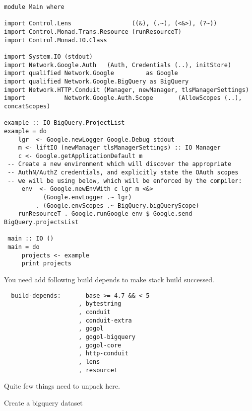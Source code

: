 \begin{verbatim}
module Main where

import Control.Lens                 ((&), (.~), (<&>), (?~))
import Control.Monad.Trans.Resource (runResourceT)
import Control.Monad.IO.Class

import System.IO (stdout)
import Network.Google.Auth   (Auth, Credentials (..), initStore)
import qualified Network.Google         as Google
import qualified Network.Google.BigQuery as BigQuery
import Network.HTTP.Conduit (Manager, newManager, tlsManagerSettings)
import           Network.Google.Auth.Scope       (AllowScopes (..),                                                  concatScopes)

example :: IO BigQuery.ProjectList
example = do
    lgr  <- Google.newLogger Google.Debug stdout
    m <- liftIO (newManager tlsManagerSettings) :: IO Manager
    c <- Google.getApplicationDefault m
 -- Create a new environment which will discover the appropriate
 -- AuthN/AuthZ credentials, and explicitly state the OAuth scopes
 -- we will be using below, which will be enforced by the compiler:
     env  <- Google.newEnvWith c lgr m <&>
           (Google.envLogger .~ lgr)
         . (Google.envScopes .~ BigQuery.bigQueryScope)
    runResourceT . Google.runGoogle env $ Google.send BigQuery.projectsList

 main :: IO ()
 main = do
     projects <- example
     print projects
\end{verbatim}

You need add following build depends to make stack build successed.

\begin{verbatim}
  build-depends:       base >= 4.7 && < 5
                     , bytestring
                     , conduit
                     , conduit-extra
                     , gogol
                     , gogol-bigquery
                     , gogol-core
                     , http-conduit
                     , lens
                     , resourcet
\end{verbatim}

Quite few things need to unpack here.

Create a bigquery dataset


